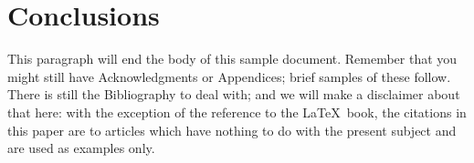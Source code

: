 \section{Conclusions}
This paragraph will end the body of this sample document.
Remember that you might still have Acknowledgments or
Appendices; brief samples of these
follow.  There is still the Bibliography to deal with; and
we will make a disclaimer about that here: with the exception
of the reference to the \LaTeX\ book, the citations in
this paper are to articles which have nothing to
do with the present subject and are used as
examples only.

